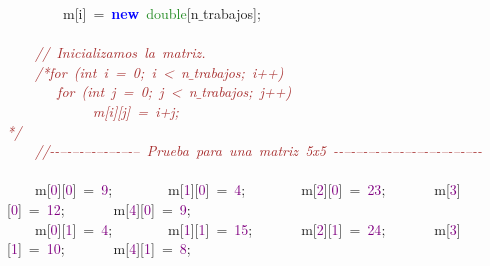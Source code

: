 \mbox{}\ \ \ \ \ \ \ \ m\textcolor{BrickRed}{[}i\textcolor{BrickRed}{]}\ \textcolor{BrickRed}{=}\ \textbf{\textcolor{Blue}{new}}\ \textcolor{ForestGreen}{double}\textcolor{BrickRed}{[}n$\_$trabajos\textcolor{BrickRed}{];}\  \\
\mbox{} \\
\mbox{}\ \ \ \ \textit{\textcolor{Brown}{//\ Inicializamos\ la\ matriz.\ }} \\
\mbox{}\ \ \ \ \textit{\textcolor{Brown}{/*for\ (int\ i\ =\ 0;\ i\ \textless{}\ n$\_$trabajos;\ i++)}} \\
\mbox{}\textit{\textcolor{Brown}{\ \ \ \ \ \ \ for\ (int\ j\ =\ 0;\ j\ \textless{}\ n$\_$trabajos;\ j++)}} \\
\mbox{}\textit{\textcolor{Brown}{\ \ \ \ \ \ \ \ \ \ \ \ m[i][j]\ =\ i+j;\ }} \\
\mbox{}\textit{\textcolor{Brown}{*/}} \\
\mbox{}\ \ \ \ \textit{\textcolor{Brown}{//-\/-\/--\/-\/--\/-\/--\/-\/--\/-\/--\/-\/--\/-\/--\ Prueba\ para\ una\ matriz\ 5x5\ -\/-\/--\/-\/--\/-\/--\/-\/--\/-\/--\/-\/--\/-\/--\/-\/--\/-\/--\/-\/--\/-\/--\/-\/-}} \\
\mbox{} \\
\mbox{}\ \ \ \ m\textcolor{BrickRed}{[}\textcolor{Purple}{0}\textcolor{BrickRed}{][}\textcolor{Purple}{0}\textcolor{BrickRed}{]}\ \textcolor{BrickRed}{=}\ \textcolor{Purple}{9}\textcolor{BrickRed}{;}\ \ \ \ \ \ \ \ m\textcolor{BrickRed}{[}\textcolor{Purple}{1}\textcolor{BrickRed}{][}\textcolor{Purple}{0}\textcolor{BrickRed}{]}\ \textcolor{BrickRed}{=}\ \textcolor{Purple}{4}\textcolor{BrickRed}{;}\ \ \ \ \ \ \ \ m\textcolor{BrickRed}{[}\textcolor{Purple}{2}\textcolor{BrickRed}{][}\textcolor{Purple}{0}\textcolor{BrickRed}{]}\ \textcolor{BrickRed}{=}\ \textcolor{Purple}{23}\textcolor{BrickRed}{;}\ \ \ \ \ \ \ m\textcolor{BrickRed}{[}\textcolor{Purple}{3}\textcolor{BrickRed}{][}\textcolor{Purple}{0}\textcolor{BrickRed}{]}\ \textcolor{BrickRed}{=}\ \textcolor{Purple}{12}\textcolor{BrickRed}{;}\ \ \ \ \ \ \ m\textcolor{BrickRed}{[}\textcolor{Purple}{4}\textcolor{BrickRed}{][}\textcolor{Purple}{0}\textcolor{BrickRed}{]}\ \textcolor{BrickRed}{=}\ \textcolor{Purple}{9}\textcolor{BrickRed}{;}\  \\
\mbox{}\ \ \ \ m\textcolor{BrickRed}{[}\textcolor{Purple}{0}\textcolor{BrickRed}{][}\textcolor{Purple}{1}\textcolor{BrickRed}{]}\ \textcolor{BrickRed}{=}\ \textcolor{Purple}{4}\textcolor{BrickRed}{;}\ \ \ \ \ \ \ \ m\textcolor{BrickRed}{[}\textcolor{Purple}{1}\textcolor{BrickRed}{][}\textcolor{Purple}{1}\textcolor{BrickRed}{]}\ \textcolor{BrickRed}{=}\ \textcolor{Purple}{15}\textcolor{BrickRed}{;}\ \ \ \ \ \ \ m\textcolor{BrickRed}{[}\textcolor{Purple}{2}\textcolor{BrickRed}{][}\textcolor{Purple}{1}\textcolor{BrickRed}{]}\ \textcolor{BrickRed}{=}\ \textcolor{Purple}{24}\textcolor{BrickRed}{;}\ \ \ \ \ \ \ m\textcolor{BrickRed}{[}\textcolor{Purple}{3}\textcolor{BrickRed}{][}\textcolor{Purple}{1}\textcolor{BrickRed}{]}\ \textcolor{BrickRed}{=}\ \textcolor{Purple}{10}\textcolor{BrickRed}{;}\ \ \ \ \ \ \ m\textcolor{BrickRed}{[}\textcolor{Purple}{4}\textcolor{BrickRed}{][}\textcolor{Purple}{1}\textcolor{BrickRed}{]}\ \textcolor{BrickRed}{=}\ \textcolor{Purple}{8}\textcolor{BrickRed}{;}\  \\
